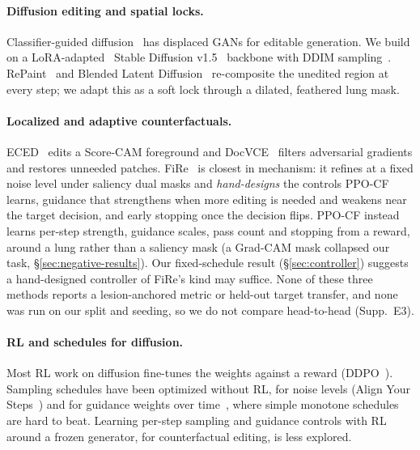 \paragraph{Diffusion editing and spatial locks.} Classifier-guided diffusion~\cite{dhariwal2021diffusion,meng2022sdedit,preechakul2022diffusion} has displaced GANs for editable generation. We build on a LoRA-adapted~\cite{hu2022lora} Stable Diffusion v1.5~\cite{rombach2022highresolution} backbone with DDIM sampling~\cite{song2021denoising}. RePaint~\cite{lugmayr2022repaint} and Blended Latent Diffusion~\cite{avrahami2022blended} re-composite the unedited region at every step; we adapt this as a soft lock through a dilated, feathered lung mask.

\paragraph{Localized and adaptive counterfactuals.} ECED~\cite{luu2025visual} edits a Score-CAM foreground and DocVCE~\cite{saifullah2025docvce} filters adversarial gradients and restores unneeded patches. FiRe~\cite{zeng2026fire} is closest in mechanism: it refines at a fixed noise level under saliency dual masks and \emph{hand-designs} the controls PPO-CF learns, guidance that strengthens when more editing is needed and weakens near the target decision, and early stopping once the decision flips. PPO-CF instead learns per-step strength, guidance scales, pass count and stopping from a reward, around a lung rather than a saliency mask (a Grad-CAM mask collapsed our task, \S\ref{sec:negative-results}). Our fixed-schedule result (\S\ref{sec:controller}) suggests a hand-designed controller of FiRe's kind may suffice. None of these three methods reports a lesion-anchored metric or held-out target transfer, and none was run on our split and seeding, so we do not compare head-to-head (Supp.~E3).

\paragraph{RL and schedules for diffusion.} Most RL work on diffusion fine-tunes the weights against a reward (\eg DDPO~\cite{black2024training}). Sampling schedules have been optimized without RL, for noise levels (Align Your Steps~\cite{sabour2024align}) and for guidance weights over time~\cite{wang2024cfgschedulers}, where simple monotone schedules are hard to beat. Learning per-step sampling and guidance controls with RL around a frozen generator, for counterfactual editing, is less explored.
